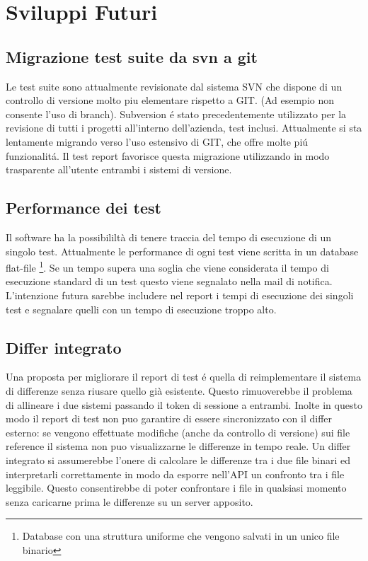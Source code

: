 \chapter{Sviluppi Futuri}
    \section{Migrazione test suite da svn a git}
        Le test suite sono attualmente revisionate dal sistema SVN che dispone di un controllo di versione molto piu elementare rispetto a GIT.
        (Ad esempio non consente l'uso di branch).
        Subversion \'e stato precedentemente utilizzato per la revisione di tutti i progetti all'interno dell'azienda, test inclusi.
        Attualmente si sta lentamente migrando verso l'uso estensivo di GIT, che offre molte pi\'u funzionalit\'a.
        Il test report favorisce questa migrazione utilizzando in modo trasparente all'utente entrambi i sistemi di versione. 
    \section{Performance dei test}
        Il software ha la possibililtà di tenere traccia del tempo di esecuzione di un singolo test.
        Attualmente le performance di ogni test viene scritta in un database flat-file \footnote{Database con una struttura uniforme che vengono salvati in un unico file binario}.
        Se un tempo supera una soglia che viene considerata il tempo di esecuzione standard di un test questo viene segnalato nella mail di notifica.
        L'intenzione futura sarebbe includere nel report i tempi di esecuzione dei singoli test e segnalare quelli con un tempo di esecuzione troppo alto.
    \section{Differ integrato}
        Una proposta per migliorare il report di test \'e quella di reimplementare il sistema di differenze senza riusare quello già esistente.
        Questo rimuoverebbe il problema di allineare i due sistemi passando il token di sessione a entrambi.
        Inolte in questo modo il report di test non puo garantire di essere sincronizzato con il differ esterno: se vengono effettuate modifiche (anche da controllo di versione) sui file reference il sistema non puo visualizzarne le differenze in tempo reale.
        Un differ integrato si assumerebbe l'onere di calcolare le differenze tra i due file binari ed interpretarli correttamente in modo da esporre nell'API un confronto tra i file leggibile.
        Questo consentirebbe di poter confrontare i file in qualsiasi momento senza caricarne prima le differenze su un server apposito.